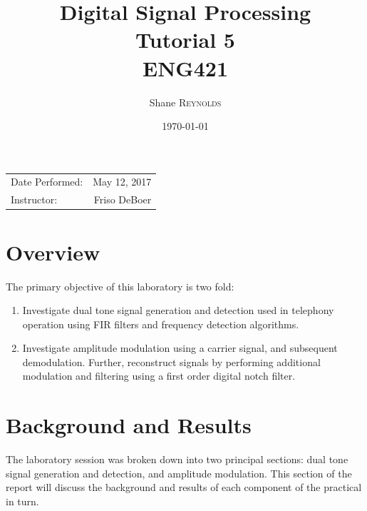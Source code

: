 \documentclass{article}
\title{Digital Signal Processing \\ Tutorial 5 \\ ENG421} %
\author{Shane \textsc{Reynolds}} %
\date{\today} %
\begin{document}
\maketitle %

\begin{center}
\begin{tabular}{l r}
Date Performed: & May 12, 2017 \\ %
Instructor: & Friso DeBoer %
\end{tabular}
\end{center}

\tableofcontents
\newpage


\section{Overview}
The primary objective of this laboratory is two fold:
\begin{enumerate}[label=\roman*]
	\item Investigate dual tone signal generation and detection used in telephony operation using FIR filters and frequency detection algorithms.\\
	\item Investigate amplitude modulation using a carrier signal, and subsequent demodulation. Further, reconstruct signals by performing additional modulation and filtering using a first order digital notch filter.
\end{enumerate}


\section{Background and Results}
The laboratory session was broken down into two principal sections: dual tone signal generation and detection, and amplitude modulation. This section of the report will discuss the background and results of each component of the practical in turn.
\end{document}

